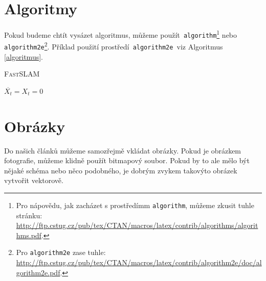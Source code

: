 \documentclass[11pt, a4paper]{article}
\begin{document}
\section{Algoritmy} \label{Sekce3}
Pokud budeme chtít vysázet algoritmus, můžeme použít\texttt{ algorithm}\footnote{Pro nápovědu, jak zacházet s prostředímm \texttt{algorithm}, můžeme zkusit tuhle stránku:\\ \href{http://ftp.cstug.cz/pub/tex/CTAN/macros/latex/contrib/algorithms/algorithms.pdf}{http://ftp.cstug.cz/pub/tex/CTAN/macros/latex/contrib/algorithms/algorithms.pdf}.} nebo\texttt{ algorithm2e}\footnote{Pro \texttt{algorithm2e} zase tuhle: \href{http://ftp.cstug.cz/pub/tex/CTAN/macros/latex/contrib/algorithm2e/doc/algorithm2e.pdf}{http://ftp.cstug.cz/pub/tex/CTAN/macros/latex/contrib/algorithm2e/doc/algorithm2e.pdf}.}. Příklad použití prostředí\verb| algorithm2e |viz Algoritmus \ref{algoritmus}.

\begin{algorithm}
    \label{algoritmus}
    \caption{\textsc{FastSLAM}}
    \SetNlSty{}{}{:}
    \SetNlSkip{-1em}
    \Indp
    \BlankLine

    $ \overline{X_t} = X_t = 0 $ \\
\end{algorithm}

\section{Obrázky}
Do našich článků můžeme samozřejmě vkládat obrázky. Pokud je obrázkem fotografie, můžeme klidně použít bitmapový soubor. Pokud by to ale mělo být nějaké schéma nebo něco podobného, je dobrým zvykem takovýto obrázek vytvořit vektorově.
\end{document}
